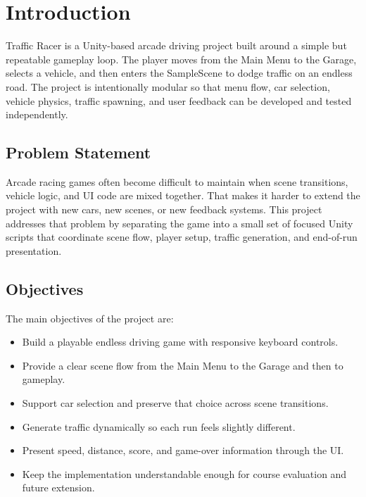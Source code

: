\documentclass[12pt,a4paper]{article}
\begin{document}
\tableofcontents
\newpage
\listoffigures
\newpage
{}

\section{Introduction}
Traffic Racer is a Unity-based arcade driving project built around a simple but repeatable gameplay loop. The player moves from the Main Menu to the Garage, selects a vehicle, and then enters the SampleScene to dodge traffic on an endless road. The project is intentionally modular so that menu flow, car selection, vehicle physics, traffic spawning, and user feedback can be developed and tested independently.

\subsection{Problem Statement}
Arcade racing games often become difficult to maintain when scene transitions, vehicle logic, and UI code are mixed together. That makes it harder to extend the project with new cars, new scenes, or new feedback systems. This project addresses that problem by separating the game into a small set of focused Unity scripts that coordinate scene flow, player setup, traffic generation, and end-of-run presentation.

\subsection{Objectives}
The main objectives of the project are:
\begin{itemize}
    \item Build a playable endless driving game with responsive keyboard controls.
    \item Provide a clear scene flow from the Main Menu to the Garage and then to gameplay.
    \item Support car selection and preserve that choice across scene transitions.
    \item Generate traffic dynamically so each run feels slightly different.
    \item Present speed, distance, score, and game-over information through the UI.
    \item Keep the implementation understandable enough for course evaluation and future extension.
\end{itemize}
\end{document}
